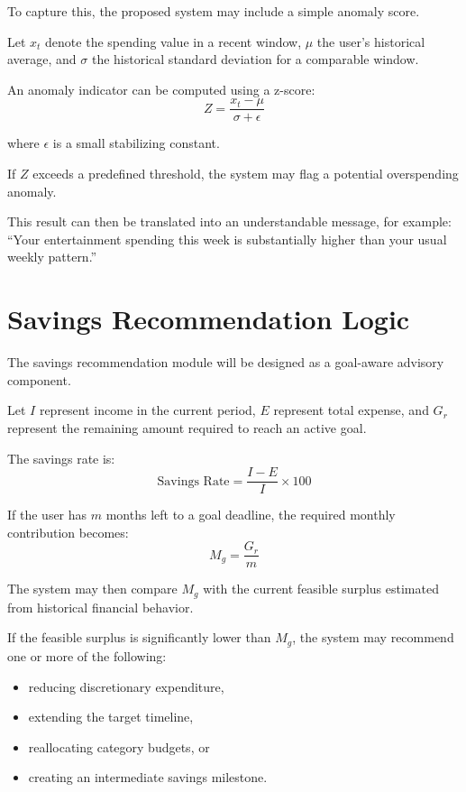 \documentclass[12pt,a4paper]{report}
\begin{document}
To capture this,
the proposed system may include a simple anomaly score.

Let
$x_t$
denote the spending value in a recent window,
$\mu$
the user’s historical average,
and
$\sigma$
the historical standard deviation for a comparable window.

An anomaly indicator can be computed using a z-score:
\begin{equation}
Z = \frac{x_t - \mu}{\sigma + \epsilon}
\end{equation}

where
$\epsilon$
is a small stabilizing constant.

If
$Z$
exceeds a predefined threshold,
the system may flag a potential overspending anomaly.

This result can then be translated into an understandable message,
for example:
``Your entertainment spending this week is substantially higher than your usual weekly pattern.''

\section{Savings Recommendation Logic}
The savings recommendation module will be designed as a goal-aware advisory component.

Let
$I$
represent income in the current period,
$E$
represent total expense,
and
$G_r$
represent the remaining amount required to reach an active goal.

The savings rate is:
\begin{equation}
\text{Savings Rate} = \frac{I - E}{I} \times 100
\end{equation}

If the user has
$m$
months left to a goal deadline,
the required monthly contribution becomes:
\begin{equation}
M_g = \frac{G_r}{m}
\end{equation}

The system may then compare
$M_g$
with the current feasible surplus estimated from historical financial behavior.

If the feasible surplus is significantly lower than
$M_g$,
the system may recommend one or more of the following:
\begin{itemize}[leftmargin=2em]
\item reducing discretionary expenditure,
\item extending the target timeline,
\item reallocating category budgets,
or
\item creating an intermediate savings milestone.
\end{itemize}
\end{document}
